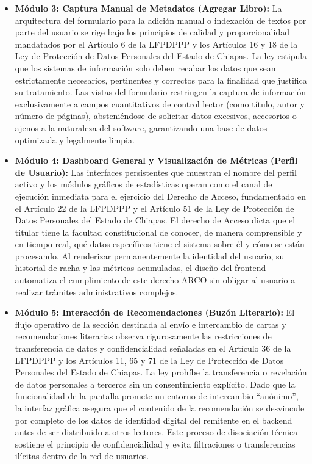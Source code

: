 \documentclass[12pt, atypical, journal]{article}
\begin{document}
\begin{itemize}
    \item \textbf{Módulo 3: Captura Manual de Metadatos (Agregar Libro):} La arquitectura del formulario para la adición manual o indexación de textos por parte del usuario se rige bajo los principios de calidad y proporcionalidad mandatados por el Artículo 6 de la LFPDPPP y los Artículos 16 y 18 de la Ley de Protección de Datos Personales del Estado de Chiapas. La ley estipula que los sistemas de información solo deben recabar los datos que sean estrictamente necesarios, pertinentes y correctos para la finalidad que justifica su tratamiento. Las vistas del formulario restringen la captura de información exclusivamente a campos cuantitativos de control lector (como título, autor y número de páginas), absteniéndose de solicitar datos excesivos, accesorios o ajenos a la naturaleza del software, garantizando una base de datos optimizada y legalmente limpia.
    
    \item \textbf{Módulo 4: Dashboard General y Visualización de Métricas (Perfil de Usuario):} Las interfaces persistentes que muestran el nombre del perfil activo y los módulos gráficos de estadísticas operan como el canal de ejecución inmediata para el ejercicio del Derecho de Acceso, fundamentado en el Artículo 22 de la LFPDPPP y el Artículo 51 de la Ley de Protección de Datos Personales del Estado de Chiapas. El derecho de Acceso dicta que el titular tiene la facultad constitucional de conocer, de manera comprensible y en tiempo real, qué datos específicos tiene el sistema sobre él y cómo se están procesando. Al renderizar permanentemente la identidad del usuario, su historial de racha y las métricas acumuladas, el diseño del frontend automatiza el cumplimiento de este derecho ARCO sin obligar al usuario a realizar trámites administrativos complejos.
    
    \item \textbf{Módulo 5: Interacción de Recomendaciones (Buzón Literario):} El flujo operativo de la sección destinada al envío e intercambio de cartas y recomendaciones literarias observa rigurosamente las restricciones de transferencia de datos y confidencialidad señaladas en el Artículo 36 de la LFPDPPP y los Artículos 11, 65 y 71 de la Ley de Protección de Datos Personales del Estado de Chiapas. La ley prohíbe la transferencia o revelación de datos personales a terceros sin un consentimiento explícito. Dado que la funcionalidad de la pantalla promete un entorno de intercambio ``anónimo'', la interfaz gráfica asegura que el contenido de la recomendación se desvincule por completo de los datos de identidad digital del remitente en el backend antes de ser distribuido a otros lectores. Este proceso de disociación técnica sostiene el principio de confidencialidad y evita filtraciones o transferencias ilícitas dentro de la red de usuarios.
   \end{itemize}
\newpage
\end{document}
